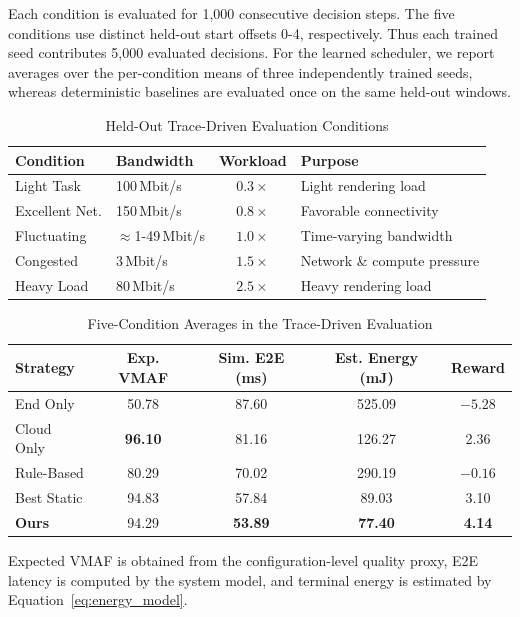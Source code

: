 \documentclass[10pt,journal,compsoc]{IEEEtran}
\begin{document}
Each condition is evaluated for 1,000 consecutive decision steps. The five conditions use distinct held-out start offsets 0-4, respectively. Thus each trained seed contributes 5,000 evaluated decisions. For the learned scheduler, we report averages over the per-condition means of three independently trained seeds, whereas deterministic baselines are evaluated once on the same held-out windows.

\begin{table}[t]
	\centering
	\caption{Held-Out Trace-Driven Evaluation Conditions}
	\label{tab:eval_conditions}
	\scriptsize
	\setlength{\tabcolsep}{2.5pt}
	\renewcommand{\arraystretch}{1.05}
	\begin{tabularx}{\columnwidth}{@{}l l c X@{}}
		\toprule
		\textbf{Condition} & \textbf{Bandwidth} & \textbf{Workload} & \textbf{Purpose} \\
		\midrule
		Light Task & 100\,Mbit/s & $0.3\times$ & Light rendering load \\
		Excellent Net. & 150\,Mbit/s & $0.8\times$ & Favorable connectivity \\
		Fluctuating & $\approx$1-49\,Mbit/s & $1.0\times$ & Time-varying bandwidth \\
		Congested & 3\,Mbit/s & $1.5\times$ & Network \& compute pressure \\
		Heavy Load & 80\,Mbit/s & $2.5\times$ & Heavy rendering load \\
		\bottomrule
	\end{tabularx}
\end{table}

\begin{table}[t]
	\centering
	\caption{Five-Condition Averages in the Trace-Driven Evaluation}
	\label{tab:quantitative}
	\footnotesize
	\setlength{\tabcolsep}{2.5pt}
	\renewcommand{\arraystretch}{1.05}
	\begin{tabular*}{\columnwidth}{@{\extracolsep{\fill}}lcccc@{}}
		\toprule
		\textbf{Strategy} & \textbf{Exp. VMAF} & \textbf{Sim. E2E (ms)} &
		\textbf{Est. Energy (mJ)} & \textbf{Reward} \\
		\midrule
		End Only & 50.78 & 87.60 & 525.09 & $-5.28$ \\
		Cloud Only & \textbf{96.10} & 81.16 & 126.27 & 2.36 \\
		Rule-Based & 80.29 & 70.02 & 290.19 & $-0.16$ \\
		Best Static & 94.83 & 57.84 & 89.03 & 3.10 \\
		\textbf{Ours} & 94.29 & \textbf{53.89} & \textbf{77.40} & \textbf{4.14} \\
		\bottomrule
	\end{tabular*}
	\par\smallskip
	\raggedright\scriptsize Expected VMAF is obtained from the configuration-level quality proxy, E2E latency is computed by the system model, and terminal energy is estimated by Equation~\ref{eq:energy_model}.\par
\end{table}
\end{document}
